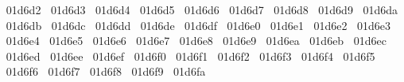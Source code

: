 {  ^^^^^^01d6d2%
  ^^^^^^01d6d3%
  ^^^^^^01d6d4%
  ^^^^^^01d6d5%
  ^^^^^^01d6d6%
  ^^^^^^01d6d7%
  ^^^^^^01d6d8%
  ^^^^^^01d6d9%
  ^^^^^^01d6da%
  ^^^^^^01d6db%
  ^^^^^^01d6dc%
  ^^^^^^01d6dd%
  ^^^^^^01d6de%
  ^^^^^^01d6df%
  ^^^^^^01d6e0%
  ^^^^^^01d6e1%
  ^^^^^^01d6e2%
  ^^^^^^01d6e3%
  ^^^^^^01d6e4%
  ^^^^^^01d6e5%
  ^^^^^^01d6e6%
  ^^^^^^01d6e7%
  ^^^^^^01d6e8%
  ^^^^^^01d6e9%
  ^^^^^^01d6ea%
  ^^^^^^01d6eb%
  ^^^^^^01d6ec%
  ^^^^^^01d6ed%
  ^^^^^^01d6ee%
  ^^^^^^01d6ef%
  ^^^^^^01d6f0%
  ^^^^^^01d6f1%
  ^^^^^^01d6f2%
  ^^^^^^01d6f3%
  ^^^^^^01d6f4%
  ^^^^^^01d6f5%
  ^^^^^^01d6f6%
  ^^^^^^01d6f7%
  ^^^^^^01d6f8%
  ^^^^^^01d6f9%
  ^^^^^^01d6fa%
}
